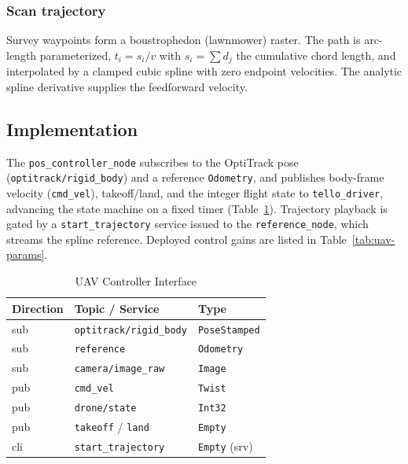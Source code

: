 \documentclass[conference]{IEEEtran}
\newcommand{\subsys}[1]{\texttt{#1}}      %
\begin{document}
\subsubsection{Scan trajectory}
Survey waypoints form a boustrophedon (lawnmower) raster. The path is
arc-length parameterized, $t_i=s_i/v$ with $s_i=\sum d_j$ the cumulative chord
length, and interpolated by a clamped cubic spline with zero endpoint
velocities. The analytic spline derivative supplies the feedforward velocity.

\subsection{Implementation}
The \subsys{pos\_controller\_node} subscribes to the OptiTrack pose
(\texttt{optitrack/rigid\_body}) and a reference \texttt{Odometry}, and publishes
body-frame velocity (\texttt{cmd\_vel}), takeoff/land, and the integer flight
state to \subsys{tello\_driver}, advancing the state machine on a fixed timer
(Table~\ref{tab:uav-io}). Trajectory playback is gated by a
\texttt{start\_trajectory} service issued to the \subsys{reference\_node}, which
streams the spline reference. Deployed control gains are listed in
Table~\ref{tab:uav-params}.

\begin{table}[t]
\caption{UAV Controller Interface}
\label{tab:uav-io}
\centering
\begin{tabular}{@{}lll@{}}
\toprule
\textbf{Direction} & \textbf{Topic / Service} & \textbf{Type} \\
\midrule
sub & \texttt{optitrack/rigid\_body} & \texttt{PoseStamped} \\
sub & \texttt{reference} & \texttt{Odometry} \\
sub & \texttt{camera/image\_raw} & \texttt{Image} \\
pub & \texttt{cmd\_vel} & \texttt{Twist} \\
pub & \texttt{drone/state} & \texttt{Int32} \\
pub & \texttt{takeoff} / \texttt{land} & \texttt{Empty} \\
cli & \texttt{start\_trajectory} & \texttt{Empty} (srv) \\
\bottomrule
\end{tabular}
\end{table}
\end{document}
